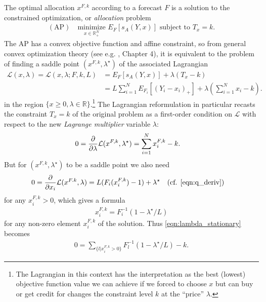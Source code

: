 \documentclass{article}
\begin{document}
The optimal allocation $x^{F,k}$ according to a forecast $F$ is a solution to the constrained optimization, or \emph{allocation} problem
\begin{align}
    (\mathrm{AP}) \quad \underset{x \in \mathbb{R}_{+}^N}{\mathrm{minimize}}\,\, E_{F}\left[s_A(Y,x)\right] \text{ subject to } 
    T_x = k. \label{AP}
\end{align}
The AP has a convex objective function and affine constraint, so from general convex optimization theory 
(see e.g. \cite{ruszczynski2011nonlinear}, Chapter 4), it is equivalent to the
problem of finding a saddle point $(x^{F,k}, \lambda^{\star})$ of the associated Lagrangian 
\begin{align}
\mathcal{L}(x, \lambda) = \mathcal{L}(x, \lambda; F, k, L) 
&= E_F\left[s_A(Y,x)\right] + \lambda(T_x - k) \\
&= L\sum_{i=1}^{N} E_{F_i}[(Y_i - x_i)_{+}] + \lambda\left(\sum_{i=1}^{N} x_i - k\right).  
\end{align}
in the region $\{x \geq 0, \lambda \in \mathbb{R}\}$.\footnote{The Lagrangian in this context has the interpretation as the best (lowest) objective function value we can achieve if we forced to choose $x$ but can buy or get credit for changes the constraint level $k$ 
at the ``price'' $\lambda$.}
The Lagrangian reformulation in particular recasts the constraint $T_x=k$ of the original problem as a first-order condition on $\mathcal{L}$ with respect to the new \emph{Lagrange multiplier} variable $\lambda$:
\begin{align}
0 = \frac{\partial {} }{\partial {\lambda}} \mathcal{L}(x^{F,k}, \lambda^{\star}) &= \sum_{i=1}^{N} x_i^{F,k} - k. \label{eqn:lambda_stationary}
\end{align}
But for $(x^{F,k}, \lambda^{\star})$ to be a saddle point we also need
\begin{align}
0 = \frac{\partial}{\partial x_i} \mathcal{L}(x^{F.k}, \lambda) &= L(F_i(x_i^{F,k})-1) + \lambda^{\star} 
\quad (\text{cf. \eqref{eqn:q_deriv}}) \label{eqn:x_stationary}
\end{align}
for any $x_i^{F,k} > 0$, which gives a formula 
\begin{align}
x_i^{F,k} = F_i^{-1}(1-\lambda^{\star}/L) \label{eqn:xfk_formula}
\end{align}
for any non-zero element $x_i^{F,k}$ of the solution. Thus \eqref{eqn:lambda_stationary} becomes
\begin{align}
0 = \sum_{\{l | x_i^{F,k} > 0\}} F_{l}^{-1}(1-\lambda^{\star}/L) - k. \label{eqn:lambda_stationary2}
\end{align}
\end{document}
